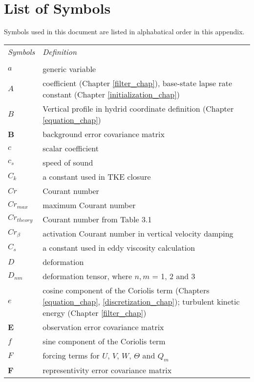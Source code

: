 \chapter{List of Symbols}
\label{List of Symbols}

Symbols used in this document are listed in alphabatical order in this appendix.
\\[2ex]

\begin{tabular}{ l p{5.5in} }

{\em Symbols}  & {\em Definition} \\   
\\
$a$            & generic variable \\ 
$A$            & coefficient (Chapter \ref{filter_chap}), base-state lapse rate constant (Chapter \ref{initialization_chap})  \\  
$B$            & Vertical profile in hydrid coordinate definition (Chapter \ref{equation_chap}) \\
{\bf B}        & background error covariance matrix \\  
$c$            & scalar coefficient \\  
$c_s$          & speed of sound      \\  
$C_k$          & a constant used in TKE closure \\  
$Cr$           & Courant number      \\  
$Cr_{max}$     & maximum Courant number      \\  
$Cr_{theory}$  & Courant number from Table 3.1 \\  
$Cr_{\beta}$   & activation Courant number in vertical velocity damping \\  
$C_s$          & a constant used in eddy viscosity calculation \\  
$D$            & deformation \\
$D_{nm}$       & deformation tensor, where $n, m$ = 1, 2 and 3 \\  
$e$            & cosine component of the Coriolis term (Chapters \ref{equation_chap}, \ref{discretization_chap}); turbulent kinetic energy (Chapter \ref{filter_chap}) \\
{\bf E}        & observation error covariance matrix \\
$f$            & sine component of the Coriolis term \\
$F$            & forcing terms for $U$, $V$, $W$, $\Theta$ and $Q_m$  \\
{\bf F}        & representivity error covariance matrix \\

\end{tabular}
